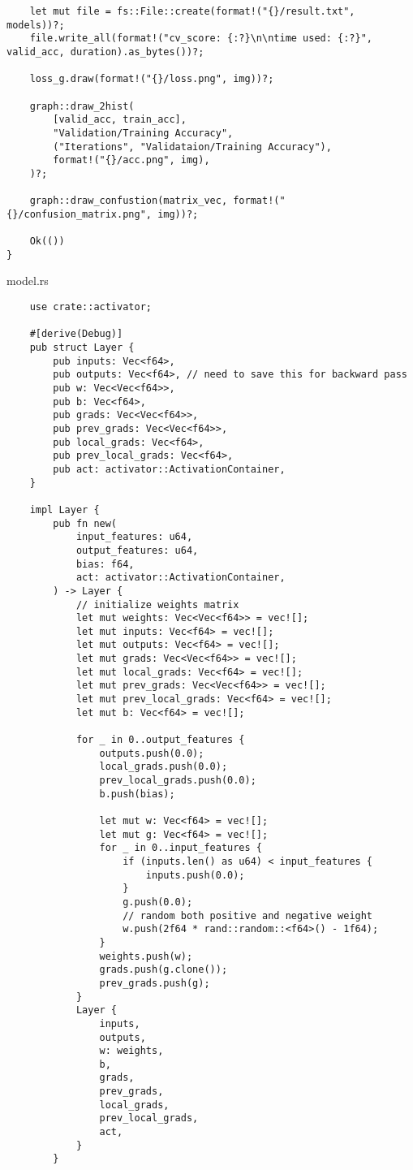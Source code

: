 \begin{verbatim}
    let mut file = fs::File::create(format!("{}/result.txt", models))?;
    file.write_all(format!("cv_score: {:?}\n\ntime used: {:?}", valid_acc, duration).as_bytes())?;

    loss_g.draw(format!("{}/loss.png", img))?;

    graph::draw_2hist(
        [valid_acc, train_acc],
        "Validation/Training Accuracy",
        ("Iterations", "Validataion/Training Accuracy"),
        format!("{}/acc.png", img),
    )?;

    graph::draw_confustion(matrix_vec, format!("{}/confusion_matrix.png", img))?;

    Ok(())
}
\end{verbatim}
\noindent model.rs
\begin{verbatim}
    use crate::activator;

    #[derive(Debug)]
    pub struct Layer {
        pub inputs: Vec<f64>,
        pub outputs: Vec<f64>, // need to save this for backward pass
        pub w: Vec<Vec<f64>>,
        pub b: Vec<f64>,
        pub grads: Vec<Vec<f64>>,
        pub prev_grads: Vec<Vec<f64>>,
        pub local_grads: Vec<f64>,
        pub prev_local_grads: Vec<f64>,
        pub act: activator::ActivationContainer,
    }
    
    impl Layer {
        pub fn new(
            input_features: u64,
            output_features: u64,
            bias: f64,
            act: activator::ActivationContainer,
        ) -> Layer {
            // initialize weights matrix
            let mut weights: Vec<Vec<f64>> = vec![];
            let mut inputs: Vec<f64> = vec![];
            let mut outputs: Vec<f64> = vec![];
            let mut grads: Vec<Vec<f64>> = vec![];
            let mut local_grads: Vec<f64> = vec![];
            let mut prev_grads: Vec<Vec<f64>> = vec![];
            let mut prev_local_grads: Vec<f64> = vec![];
            let mut b: Vec<f64> = vec![];
    
            for _ in 0..output_features {
                outputs.push(0.0);
                local_grads.push(0.0);
                prev_local_grads.push(0.0);
                b.push(bias);
    
                let mut w: Vec<f64> = vec![];
                let mut g: Vec<f64> = vec![];
                for _ in 0..input_features {
                    if (inputs.len() as u64) < input_features {
                        inputs.push(0.0);
                    }
                    g.push(0.0);
                    // random both positive and negative weight
                    w.push(2f64 * rand::random::<f64>() - 1f64);
                }
                weights.push(w);
                grads.push(g.clone());
                prev_grads.push(g);
            }
            Layer {
                inputs,
                outputs,
                w: weights,
                b,
                grads,
                prev_grads,
                local_grads,
                prev_local_grads,
                act,
            }
        }
    

\end{verbatim}
